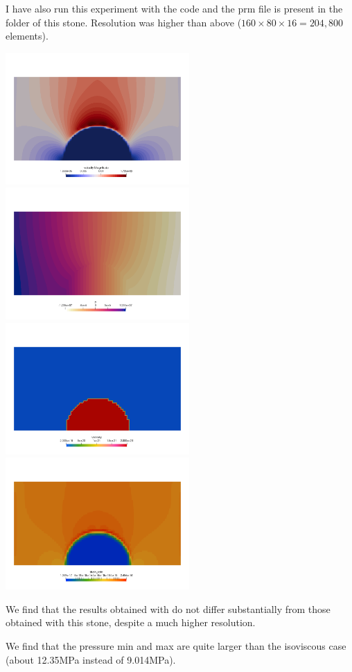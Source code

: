 I have also run this experiment with the \aspect code and the prm file is present in 
the folder of this stone. Resolution was higher than above ($160 \times 80 \times 16 =204,800$ elements).

\begin{center}
\includegraphics[width=7cm]{python_codes/fieldstone_109/results/aspect/vel}
\includegraphics[width=7cm]{python_codes/fieldstone_109/results/aspect/press}\\
\includegraphics[width=7cm]{python_codes/fieldstone_109/results/aspect/eta}
\includegraphics[width=7cm]{python_codes/fieldstone_109/results/aspect/sr}
\end{center}

We find that the results obtained with \aspect do not differ substantially from those
obtained with this stone, despite a much higher resolution.

We find that the pressure min and max are quite larger than the isoviscous case (about 12.35MPa instead 
of 9.014MPa). 



